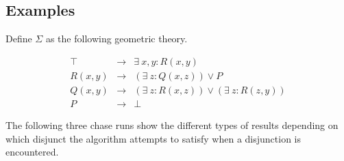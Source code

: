 	\subsection{Examples}

		Define $\Sigma$ as the following geometric theory.

		\begin{eqnarray}
			\label{eqn:chase1}
			\top    &  \to  &  \exists\ x,y : R(x,y)                             \\
			\label{eqn:chase2}
			R(x,y)  &  \to  &  (\exists\ z : Q(x,z)) \vee P                      \\
			\label{eqn:chase3}
			Q(x,y)  &  \to  &  (\exists\ z : R(x,z)) \vee (\exists\ z : R(z,y))  \\
			\label{eqn:chase4}
			P       &  \to  &  \bot
		\end{eqnarray}

		The following three chase runs show the different types of results
		depending on which disjunct the algorithm attempts to satisfy when a
		disjunction is encountered.

